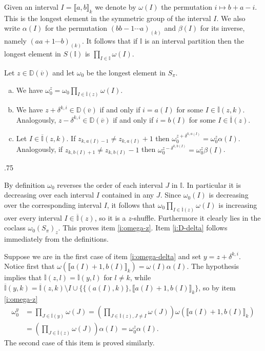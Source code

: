 \documentclass[11pt,fleqn]{amsart}
\makeatletter
\renewcommand\proofname{Proof}
\renewenvironment{proof}[1][\textit{\proofname}]{\par
 \pushQED{\qed}%
 \normalfont \topsep.75\paraskip\relax
 \trivlist
 \item[\hskip\labelsep
 \itshape
 #1\@addpunct{.}]\ignorespaces
}{%
 \popQED\endtrivlist\@endpefalse
}
\newcounter{para}[section]
\newcommand\vv{\overline{v}}
\newcommand\II{\mathbb I}
\newcommand\RI{\overline{\mathbb I}}
\newcommand\interval[1]{\llbracket #1 \rrbracket}
\newcommand\DD{\mathbb D}
\makeatother
\begin{document}
Given an interval $I = \interval{a,b}_k$ we denote by $\omega(I)$ the 
permutation $i \mapsto  b+a-i$. This is the longest element in the symmetric
group of the interval $I$. We also write $\alpha(I)$ for the permutation $(b b-
1 \cdots a)_{(k)}$ and $\beta(I)$ for its inverse, namely $(a a+1 \cdots 
b)_{(k)}$. It follows that if $\II$ is an interval partition then the longest 
element in $S(\II)$ is $\prod_{I \in \II} \omega(I)$.
\begin{Lemma}
\label{L:omega-delta}
Let $z\in \DD(\vv)$ and let $\omega_0$ be the longest element in $S_\pi$.
\begin{enumerate}[(a)]
\item 
\label{i:omega-z}
We have $\omega_0^z = \omega_0 \prod_{I \in \RI(z)} \omega(I)$.

\item 
\label{i:D-delta}
We have $z + \delta^{k,i} \in \DD(\vv)$ if and only if $i = a(I)$ for some $I 
	\in \RI(z,k)$. Analogously, $z - \delta^{k,i} \in \DD(\vv)$ if and only 
	if $i = b(I)$ for some $I \in \RI(z)$.

\item 
\label{i:omega-delta}
Let $I \in \RI(z,k)$. If $z_{k,a(I)-1} \neq z_{k,a(I)} + 1$ then 
	$\omega_0^{z + \delta^{k,a(I)}} = \omega_0^z \alpha(I)$. Analogously,
	if $z_{k,b(I)+1} \neq z_{k,b(I)} - 1$ then $\omega_0^{z - \delta^{k,b(I)}} 
	= \omega_0^z \beta(I)$.
\end{enumerate}
\end{Lemma}
\begin{proof}
By definition $\omega_0$ reverses the order of each interval $J$ in $\II$. In
particular it is decreasing over each interval $I$ contained in any $J$. Since 
$\omega_0(I)$ is decreasing over the corresponding interval $I$, it follows 
that $\omega_0 \prod_{I \in \RI(z)} \omega(I)$ is increasing over every 
interval $I \in \RI(z)$, so it is a $z$-shuffle. Furthermore it clearly lies 
in the coclass $\omega_0 (S_\pi)_z$. This proves item \ref{i:omega-z}.
Item \ref{i:D-delta} follows immediately from the definitions. 

Suppose we are in the first case of item \ref{i:omega-delta} and set $y = z + 
\delta^{k,i}$. Notice first that $\omega(\interval{a(I)+1,b(I)}_k) = 
\omega(I) \alpha(I)$. The hypothesis implies that $\RI(z,l) = \RI(y,l)$ for 
$l \neq k$, while $\RI(y,k) = \RI(z,k) \setminus I \cup \{\{(a(I),k)\},
\interval{a(I)+1,b(I)}_k\}$, so by item \ref{i:omega-z}
\begin{align*}
\omega_0^y 
	&= \prod_{J \in \RI(y)} \omega(J)
	= \left(\prod_{J \in \RI(z), J \neq I} \omega(J)\right) 
		\omega(\interval{a(I)+1,b(I)}_k) \\
	&= \left(\prod_{J \in \RI(z)} \omega(J)\right)\alpha(I)
	= \omega_0^z \alpha(I).
\end{align*}
The second case of this item is proved similarly.
\end{proof}
\end{document}
